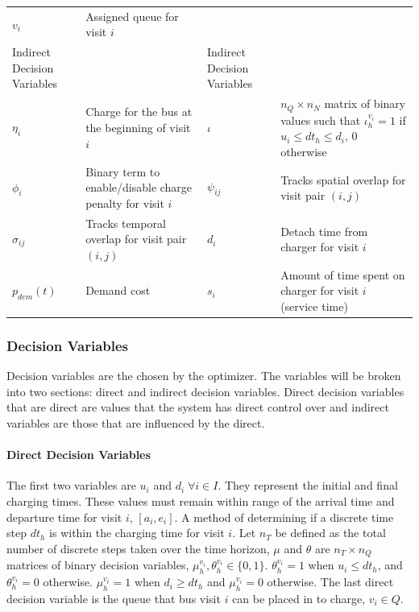\documentclass[11pt,a4paper,final]{article}
\newcommand{\Iset}{I}                       %
\newcommand{\Qset}{Q}                       %
\begin{document}
\begin{table}[htbp]
\begin{tabularx}{\textwidth}{L{0.3} L{1.2} L{0.3} L{1.2}}
\(v_i\) & Assigned queue for visit \(i\) &  & \\[0pt]
Indirect Decision Variables &  & Indirect Decision Variables & \\[0pt]
\(\eta_i\) & Charge for the bus at the beginning of visit \(i\) & \(\iota\) & \(n_Q \times n_N\) matrix of binary values such that \(\iota_h^{v_i} = 1\) if \(u_i \le dt_h \le d_i\), 0 otherwise\\[0pt]
\(\phi_i\) & Binary term to enable/disable charge penalty for visit \(i\) & \(\psi_{ij}\) & Tracks spatial overlap for visit pair \((i,j)\)\\[0pt]
\(\sigma_{ij}\) & Tracks temporal overlap for visit pair \((i,j)\) & \(d_i\) & Detach time from charger for visit \(i\)\\[0pt]
\(p_{dem}(t)\) & Demand cost & \(s_i\) & Amount of time spent on charger for visit \(i\) (service time)\\[0pt]
\hline
\end{tabularx}
\end{table}

\subsubsection{Decision Variables}
\label{sec:decision-variables}
Decision variables are the chosen by the optimizer. The variables will be broken into two sections: direct and indirect
decision variables. Direct decision variables that are direct are values that the system has direct control over and
indirect variables are those that are influenced by the direct.

\paragraph{Direct Decision Variables}
\label{sec:direct-decision-variables}
The first two variables are \(u_i\) and \(d_i \; \forall i \in \Iset\). They represent the initial and final charging times. These
values must remain within range of the arrival time and departure time for visit \(i\), \([a_i, e_i]\). A method of
determining if a discrete time step \(dt_h\) is within the charging time for visit \(i\). Let \(n_T\) be defined as the total
number of discrete steps taken over the time horizon, \(\mu\) and \(\theta\) are \(n_T \times n_Q\) matrices of binary decision variables,
\(\mu_h^{v_i}, \theta_h^{v_i} \in \{0, 1\}\). \(\theta_h^{v_i} = 1\) when \(u_i \le dt_h\), and \(\theta_h^{v_i} = 0\) otherwise. \(\mu_h^{v_i} = 1\)
when \(d_i \ge dt_h\) and \(\mu_h^{v_i} = 0\) otherwise. The last direct decision variable is the queue that bus visit \(i\) can
be placed in to charge, \(v_i \in \Qset\).
\end{document}
